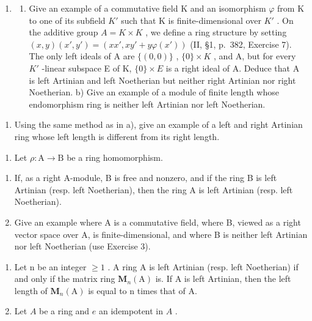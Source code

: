 \begin{enumerate}
\def\labelenumi{\arabic{enumi})}
\setcounter{enumi}{2}
\tightlist
\item
  \begin{enumerate}
  \def\labelenumii{\alph{enumii})}
  \tightlist
  \item
    Give an example of a commutative field K and an isomorphism \(\varphi\) from K to one of its subfield \(K'\) such that K is finite-dimensional over \(K'\) . On the additive group \(A = K \times K\) , we define a ring structure by setting \((x, y)(x', y') = (xx', xy' + y\varphi(x'))\) (II, §1, p.~382, Exercise 7). The only left ideals of A are \(\{(0, 0)\}\) , \(\{0\} \times K\) , and A, but for every \(K'\) -linear subspace E of K, \(\{0\} \times E\) is a right ideal of A. Deduce that A is left Artinian and left Noetherian but neither right Artinian nor right Noetherian. b) Give an example of a module of finite length whose endomorphism ring is neither left Artinian nor left Noetherian.
  \end{enumerate}
\end{enumerate}

\begin{enumerate}
\def\labelenumi{\alph{enumi})}
\setcounter{enumi}{2}
\tightlist
\item
  Using the same method as in a), give an example of a left and right Artinian ring whose left length is different from its right length.
\end{enumerate}

\begin{enumerate}
\def\labelenumi{\arabic{enumi})}
\setcounter{enumi}{3}
\tightlist
\item
  Let \(\rho : \mathrm{A} \to \mathrm{B}\) be a ring homomorphism.
\end{enumerate}

\begin{enumerate}
\def\labelenumi{\alph{enumi})}
\item
  If, as a right A-module, B is free and nonzero, and if the ring B is left Artinian (resp. left Noetherian), then the ring A is left Artinian (resp. left Noetherian).
\item
  Give an example where A is a commutative field, where B, viewed as a right vector space over A, is finite-dimensional, and where B is neither left Artinian nor left Noetherian (use Exercise 3).
\end{enumerate}

\begin{enumerate}
\def\labelenumi{\arabic{enumi})}
\setcounter{enumi}{4}
\item
  Let n be an integer \(\geqslant 1\) . A ring A is left Artinian (resp. left Noetherian) if and only if the matrix ring \(\mathbf{M}_{n}(\mathrm{A})\) is. If A is left Artinian, then the left length of \(\mathbf{M}_{n}(\mathrm{A})\) is equal to n times that of A.
\item
  Let \(A\) be a ring and \(e\) an idempotent in \(A\) .
\end{enumerate}

